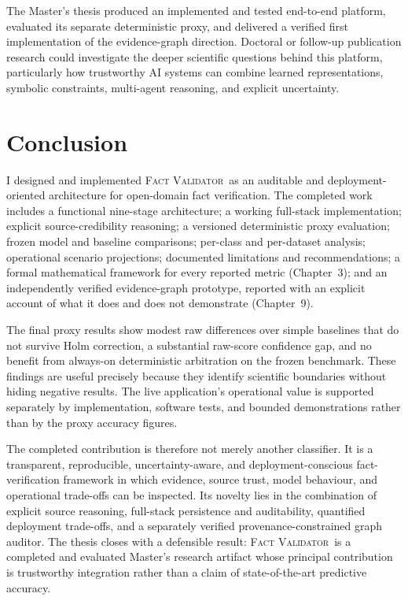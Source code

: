 \documentclass[12pt,a4paper,openany]{report}
\newcommand{\system}{\textsc{Fact Validator}}
\begin{document}
The Master's thesis produced an implemented and tested end-to-end platform, evaluated its separate deterministic proxy, and delivered a verified first implementation of the evidence-graph direction. Doctoral or follow-up publication research could investigate the deeper scientific questions behind this platform, particularly how trustworthy AI systems can combine learned representations, symbolic constraints, multi-agent reasoning, and explicit uncertainty.

\chapter{Conclusion}
I designed and implemented \system\ as an auditable and deployment-oriented architecture for open-domain fact verification. The completed work includes a functional nine-stage architecture; a working full-stack implementation; explicit source-credibility reasoning; a versioned deterministic proxy evaluation; frozen model and baseline comparisons; per-class and per-dataset analysis; operational scenario projections; documented limitations and recommendations; a formal mathematical framework for every reported metric (Chapter~3); and an independently verified evidence-graph prototype, reported with an explicit account of what it does and does not demonstrate (Chapter~9).

The final proxy results show modest raw differences over simple baselines that do not survive Holm correction, a substantial raw-score confidence gap, and no benefit from always-on deterministic arbitration on the frozen benchmark. These findings are useful precisely because they identify scientific boundaries without hiding negative results. The live application's operational value is supported separately by implementation, software tests, and bounded demonstrations rather than by the proxy accuracy figures.

The completed contribution is therefore not merely another classifier. It is a transparent, reproducible, uncertainty-aware, and deployment-conscious fact-verification framework in which evidence, source trust, model behaviour, and operational trade-offs can be inspected. Its novelty lies in the combination of explicit source reasoning, full-stack persistence and auditability, quantified deployment trade-offs, and a separately verified provenance-constrained graph auditor. The thesis closes with a defensible result: \system\ is a completed and evaluated Master's research artifact whose principal contribution is trustworthy integration rather than a claim of state-of-the-art predictive accuracy.
\end{document}
